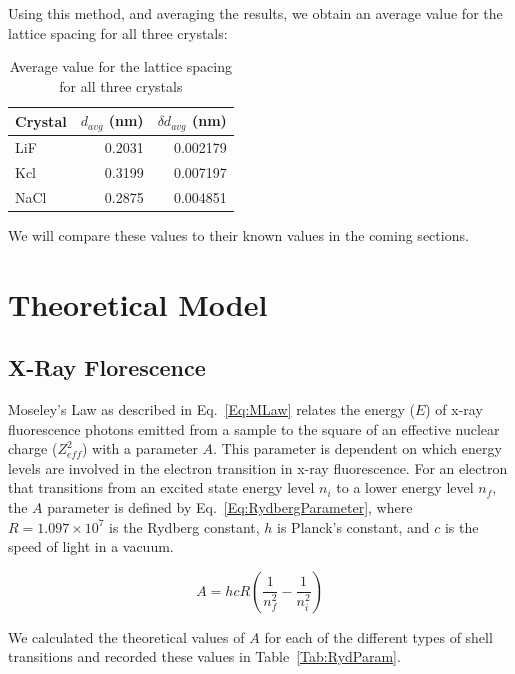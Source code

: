 \documentclass[%
 reprint,
 amsmath,amssymb,
 aps,
 pra,
]{revtex4-1}
\begin{document}
Using this method, and averaging the results, we obtain an average value for the lattice spacing for all three crystals:
\begin{table}[htbp]
	\begin{center}
	\begin{tabular}{|l|r|r|}
		\hline
		Crystal & \multicolumn{1}{l|}{$d_{avg}$ (nm)} & \multicolumn{1}{l|}{$\delta d_{avg}$ (nm)} \\ \hline
		LiF & 0.2031 & 0.002179 \\ \hline
		Kcl & 0.3199 & 0.007197 \\ \hline
		NaCl & 0.2875 & 0.004851 \\ \hline
	\end{tabular}
	\end{center}
	\caption{Average value for the lattice spacing for all three crystals}
	\label{table:d_average}
\end{table}
We will compare these values to their known values in the coming sections.

\section{Theoretical Model}

\subsection{X-Ray Florescence}

Moseley's Law as described in Eq.~\ref{Eq:MLaw} relates the energy ($E$) of x-ray fluorescence photons emitted from a sample to the square of an effective nuclear charge ($Z_{eff}^{2}$) with a parameter $A$. This parameter is dependent on which energy levels are involved in the electron transition in x-ray fluorescence. For an electron that transitions from an excited state energy level $n_{i}$ to a lower energy level $n_{f}$, the $A$ parameter is defined by Eq.~\ref{Eq:RydbergParameter}, where $R = 1.097 \times 10^7$ is the Rydberg constant, $h$ is Planck's constant, and $c$ is the speed of light in a vacuum.

\begin{equation}\label{Eq:RydbergParameter}
A = hcR(\frac{1}{n_{f}^{2}} - \frac{1}{n_{i}^{2}})
\end{equation}

We calculated the theoretical values of $A$ for each of the different types of shell transitions and recorded these values in Table~\ref{Tab:RydParam}.
\end{document}
